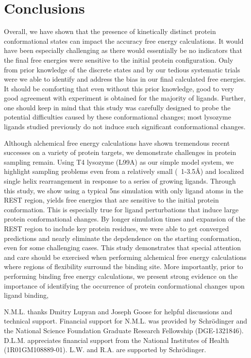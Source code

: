 \documentclass[journal=jctcce,manuscript=article]{achemso}
\begin{document}
\section{Conclusions}
Overall, we have shown that the presence of kinetically distinct protein conformational states can impact the accuracy free energy calculations.
It would have been especially challenging as there would essentially be no indicators that the final free energies were sensitive to the initial protein configuration.
Only from prior knowledge of the discrete states and by our tedious systematic trials were we able to identify and address the bias in our final calculated free energies.  
It should be comforting that even without this prior knowledge, good to very good agreement with experiment is obtained for the majority of ligands. 
Further, one should keep in mind that this study was carefully designed to probe the potential difficulties caused by these conformational changes; most lysozyme ligands studied previously do not induce such significant conformational changes. 

Although alchemical free energy calculations have shown tremendous recent successes on a variety of protein targets\cite{FEPplus}, we demonstrate challenges in protein sampling remain. 
Using T4 lysozyme (L99A) as our simple model system, we highlight sampling problems even from a relatively small (~1-3.5\AA) and localized single helix rearrangement in response to a series of growing ligands.
Through this study, we show using a typical 5ns simulation with only ligand atoms in the REST region, yields free energies that are sensitive to the initial protein conformation.
This is especially true for ligand perturbations that induce large protein conformational changes.
By longer simulation times and expansion of the REST region to include key protein residues, we were able to get converged predictions and nearly eliminate the depdendence on the starting conformation, even for some challenging cases.
This study demonstrates that special attention and care should be exercised when performing alchemical free energy calculations where regions of flexibility surround the binding site.
More importantly, prior to performing binding free energy calculations, we present strong evidence on the importance of identifying the occurrence of protein conformational changes upon ligand binding, 

\begin{acknowledgement}
   N.M.L. thanks Dmitry Lupyan and Joseph Goose for helpful discussions and technical support. Financial support for N.M.L. was provided by Schr\"{o}dinger and the National Science Foundation Graduate Research Fellowship (DGE-1321846). D.L.M. appreciates financial support from the National Institutes of Health (1R01GM108889-01). L.W. and R.A. are supported by Schr\"{o}dinger.
\end{acknowledgement}
\end{document}
